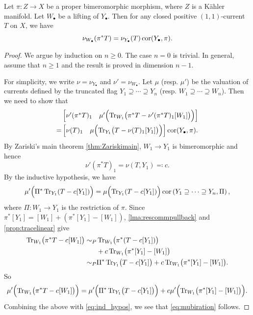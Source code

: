 \begin{proposition}\label{prop:cormatrix}
    Let $\pi\colon Z\rightarrow X$ be a proper bimeromorphic morphism, where $Z$ is a Kähler manifold. Let $W_{\bullet}$ be a lifting of $Y_{\bullet}$. Then for any closed positive $(1,1)$-current $T$ on $X$, we have
    \begin{equation}
    \nu_{W_{\bullet}}(\pi^*T)= \nu_{Y_{\bullet}}(T)\operatorname{cor}(Y_{\bullet},\pi).
    \end{equation}
\end{proposition}
\begin{proof}
    We argue by induction on $n\geq 0$. The case $n=0$ is trivial. In general, assume that $n\geq 1$ and the result is proved in dimension $n-1$.

    For simplicity, we write $\nu=\nu_{Y_{\bullet}}$ and $\nu'=\nu_{W_{\bullet}}$.
    Let $\mu$ (resp. $\mu'$) be the valuation of currents defined by the truncated flag $Y_1\supseteq\cdots \supseteq Y_n$ (resp. $W_1\supseteq\cdots \supseteq W_n$). Then we need to show that
    \begin{equation}\label{eq:mubiration}
    \begin{split}
    &\begin{bmatrix}
     \nu'(\pi^*T)_1 &
     \mu'\Bigl( \operatorname{Tr}_{W_1}\bigl(\pi^*T-\nu'(\pi^*T)_1[W_1]\bigr)\Bigr)
    \end{bmatrix}\\
    =&
    \begin{bmatrix}
        \nu(T)_1 &
        \mu\Bigl(\operatorname{Tr}_{Y_1}\bigl(T-\nu(T)_1[Y_1]\bigr)\Bigr)
    \end{bmatrix}\operatorname{cor}(Y_{\bullet},\pi).
    \end{split}
    \end{equation}
    By Zariski's main theorem \cref{thm:Zariskimain}, $W_1\to Y_1$ is bimeromorphic and hence
    \[
        \nu'(\pi^*T)_1=\nu(T,Y_1)\eqqcolon c.
    \]
    By the inductive hypothesis, we have
    \begin{equation}\label{eq:ind_hypos}
        \mu'\Bigl(\Pi^{*} \operatorname{Tr}_{Y_1}(T-c[Y_1])\Bigr)=\mu\Bigl(\operatorname{Tr}_{Y_1}(T-c[Y_1])\Bigr)\operatorname{cor}\left(Y_1\supseteq \cdots \supseteq Y_n,\Pi\right),
    \end{equation}
    where $\Pi\colon W_1\rightarrow Y_1$ is the restriction of $\pi$. Since $\pi^*[Y_1]=[W_1]+(\pi^*[Y_1]-[W_1])$, \cref{lma:rescommpullback} and \cref{prop:tracelinear} give
    \[
    \begin{split}
        \operatorname{Tr}_{W_1}\bigl(\pi^*T-c[W_1]\bigr)\sim_P&\operatorname{Tr}_{W_1}\bigl(\pi^*(T-c[Y_1])\bigr)\\
        &+c \operatorname{Tr}_{W_1}\bigl(\pi^*[Y_1]-[W_1]\bigr)\\
        \sim_P&\Pi^{*}\operatorname{Tr}_{Y_1}\bigl(T-c[Y_1]\bigr)+c \operatorname{Tr}_{W_1}\bigl(\pi^*[Y_1]-[W_1]\bigr).
    \end{split}
    \]
    So
    \[
    \mu'\Bigl(\operatorname{Tr}_{W_1}\bigl(\pi^*T-c[W_1]\bigr)\Bigr)=\mu'\Bigl(\Pi^{*}\operatorname{Tr}_{Y_1}\bigl(T-c[Y_1]\bigr)\Bigr)+c\mu'\Bigl(\operatorname{Tr}_{W_1}\bigl(\pi^*[Y_1]-[W_1]\bigr)\Bigr).
    \]
Combining the above with \eqref{eq:ind_hypos}, we see that \eqref{eq:mubiration} follows.
\end{proof}

